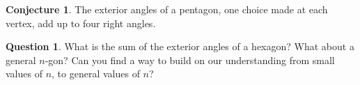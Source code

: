 \documentclass{tufte-handout}
\theoremstyle{definition}
\newtheorem{conjecture}[problem]{Conjecture}
\newtheorem{question}[problem]{Question}
\begin{document}
\begin{conjecture}\label{conj:ext-angles-pentagon}
The exterior angles of a pentagon, one choice made at each vertex, add up to four right angles.
\end{conjecture}


\begin{question}\label{question-induction}
What is the sum of the exterior angles of a hexagon? 
What about a general $n$-gon? 
Can you find a way to build on our understanding from small values of $n$, to general values of $n$?
\end{question}



\vfill
\end{document}
